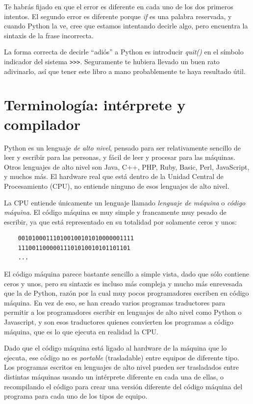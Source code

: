 Te habrás fijado en que el error es diferente en cada uno de los dos
primeros intentos. El segundo error es diferente porque \emph{if} es una
palabra reservada, y cuando Python la ve, cree que estamos intentando
decirle algo, pero encuentra la sintaxis de la frase incorrecta.

La forma correcta de decirle ``adiós'' a Python es introducir
\emph{quit()} en el símbolo indicador del sistema
\texttt{\textgreater{}\textgreater{}\textgreater{}}. Seguramente te
hubiera llevado un buen rato adivinarlo, así que tener este libro a mano
probablemente te haya resultado útil.

\hypertarget{terminologuxeda-intuxe9rprete-y-compilador}{%
\section{Terminología: intérprete y
compilador}\label{terminologuxeda-intuxe9rprete-y-compilador}}

Python es un lenguaje \emph{de alto nivel}, pensado para ser
relativamente sencillo de leer y escribir para las personas, y fácil de
leer y procesar para las máquinas. Otros lenguajes de alto nivel son
Java, C++, PHP, Ruby, Basic, Perl, JavaScript, y muchos más. El hardware
real que está dentro de la Unidad Central de Procesamiento (CPU), no
entiende ninguno de esos lenguajes de alto nivel.

La CPU entiende únicamente un lenguaje llamado \emph{lenguaje de
máquina} o \emph{código máquina}. El código máquina es muy simple y
francamente muy pesado de escribir, ya que está representado en su
totalidad por solamente ceros y unos:

\begin{verbatim}
    001010001110100100101010000001111
    11100110000011101010010101101101
    ...
\end{verbatim}

El código máquina parece bastante sencillo a simple vista, dado que sólo
contiene ceros y unos, pero su sintaxis es incluso más compleja y mucho
más enrevesada que la de Python, razón por la cual muy pocos
programadores escriben en código máquina. En vez de eso, se han creado
varios programas traductores para permitir a los programadores escribir
en lenguajes de alto nivel como Python o Javascript, y son esos
traductores quienes convierten los programas a código máquina, que es lo
que ejecuta en realidad la CPU.

Dado que el código máquina está ligado al hardware de la máquina que lo
ejecuta, ese código no es \emph{portable} (trasladable) entre equipos de
diferente tipo. Los programas escritos en lenguajes de alto nivel pueden
ser trasladados entre distintas máquinas usando un intérprete diferente
en cada una de ellas, o recompilando el código para crear una versión
diferente del código máquina del programa para cada uno de los tipos de
equipo.

